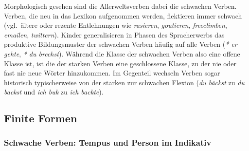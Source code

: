 \begin{table}
  \caption{Ablautstufen an Beispielen}
  \label{tab:ablstuf}
\end{table}

Morphologisch gesehen sind die Allerweltsverben dabei die schwachen Verben.
Verben, die neu in das Lexikon aufgenommen werden, flektieren immer schwach (vgl.\ ältere oder rezente Entlehnungen wie \textit{rasieren}, \textit{goutieren}, \textit{freeclimben}, \textit{emailen}, \textit{twittern}).
Kinder generalisieren in Phasen des Spracherwerbs das produktive Bildungsmuster der schwachen Verben häufig auf alle Verben (\textit{* er gehte}, \textit{* du brechst}).
Während die Klasse der schwachen Verben also eine offene Klasse ist, ist die der starken Verben eine geschlossene Klasse, zu der nie oder fast nie neue Wörter hinzukommen.
Im Gegenteil wechseln Verben sogar historisch typischerweise von der starken zur schwachen Flexion (\textit{du bäckst} zu \textit{du backst} und \textit{ich buk} zu \textit{ich backte}).

\subsection{Finite Formen}

\subsubsection{Schwache Verben: Tempus und Person im Indikativ}

\label{sec:schwvind}

